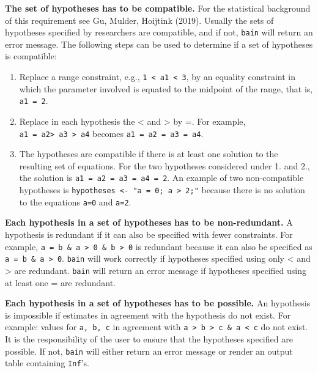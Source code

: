 \documentclass[
]{book}
\providecommand{\tightlist}{%
  \setlength{\itemsep}{0pt}\setlength{\parskip}{0pt}}
\begin{document}
\textbf{The set of hypotheses has to be compatible.} For the statistical
background of this requirement see Gu, Mulder, Hoijtink (2019). Usually the
sets of hypotheses specified by researchers are compatible, and if not,
\texttt{bain} will return an error message. The following steps can be used to
determine if a set of hypotheses is compatible:

\begin{enumerate}
\def\labelenumi{\arabic{enumi})}
\tightlist
\item
  Replace a range constraint, e.g., \texttt{1\ \textless{}\ a1\ \textless{}\ 3}, by an equality
  constraint in which the parameter involved is equated to the midpoint of the
  range, that is, \texttt{a1\ =\ 2}.
\item
  Replace in each hypothesis the \textless{} and \textgreater{} by =. For example,
  \texttt{a1\ =\ a2\textgreater{}\ a3\ \textgreater{}\ a4} becomes \texttt{a1\ =\ a2\ =\ a3\ =\ a4}.
\item
  The hypotheses are compatible if there is at least one solution to the
  resulting set of equations. For the two hypotheses considered under 1. and
  2., the solution is \texttt{a1\ =\ a2\ =\ a3\ =\ a4\ =\ 2}. An example of two non-compatible
  hypotheses is \texttt{hypotheses\ \textless{}-\ "a\ =\ 0;\ a\ \textgreater{}\ 2;"} because there is no
  solution to the equations \texttt{a=0} and \texttt{a=2}.
\end{enumerate}

\textbf{Each hypothesis in a set of hypotheses has to be non-redundant.} A
hypothesis is redundant if it can also be specified with fewer constraints.
For example, \texttt{a\ =\ b\ \&\ a\ \textgreater{}\ 0\ \&\ b\ \textgreater{}\ 0} is redundant because it can also be
specified as \texttt{a\ =\ b\ \&\ a\ \textgreater{}\ 0}. \texttt{bain} will work correctly if
hypotheses specified using only \textless{} and \textgreater{} are redundant. \texttt{bain} will
return an error message if hypotheses specified using at least one = are
redundant.

\textbf{Each hypothesis in a set of hypotheses has to be possible.} An
hypothesis is impossible if estimates in agreement with the hypothesis do not
exist. For example: values for \texttt{a,\ b,\ c} in agreement with \texttt{a\ \textgreater{}\ b\ \textgreater{}\ c\ \&\ a\ \textless{}\ c} do not exist. It is the responsibility of the user to ensure that the
hypotheses specified are possible. If not, \texttt{bain} will either return an
error message or render an output table containing \texttt{Inf}'s.
\end{document}
